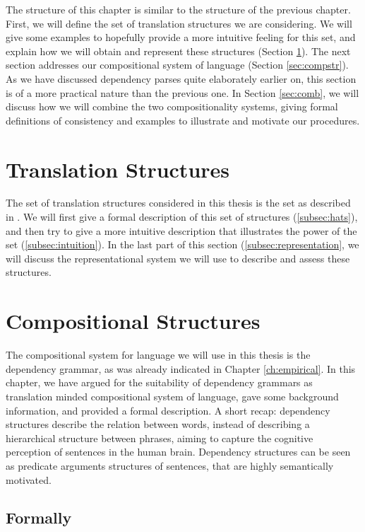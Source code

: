 \documentclass{report}
\begin{document}
The structure of this chapter is similar to the structure of the previous chapter. First, we will define the set of translation structures we are considering. We will give some examples to hopefully provide a more intuitive feeling for this set, and explain how we will obtain and represent these structures (Section \ref{sec:transstr}). The next section addresses our compositional system of language (Section \ref{sec:compstr}). As we have discussed dependency parses quite elaborately earlier on, this section is of a more practical nature than the previous one. In Section \ref{sec:comb}, we will discuss how we will combine the two compositionality systems, giving formal definitions of consistency and examples to illustrate and motivate our procedures.


\section{Translation Structures}
\label{sec:transstr}

The set of translation structures considered in this thesis is the set as described in \cite{simaan2013hats}. We will first give a formal description of this set of structures (\ref{subsec:hats}), and then try to give a more intuitive description that illustrates the power of the set (\ref{subsec:intuition}). In the last part of this section (\ref{subsec:representation}, we will discuss the representational system we will use to describe and assess these structures.


\section{Compositional Structures}

The compositional system for language we will use in this thesis is the dependency grammar, as was already indicated in Chapter \ref{ch:empirical}. In this chapter, we have argued for the suitability of dependency grammars as translation minded compositional system of language, gave some background information, and provided a formal description. A short recap: dependency structures describe the relation between words, instead of describing a hierarchical structure between phrases, aiming to capture the cognitive perception of sentences in the human brain. Dependency structures can be seen as predicate arguments structures of sentences, that are highly semantically motivated.

\subsection{Formally}
\end{document}
